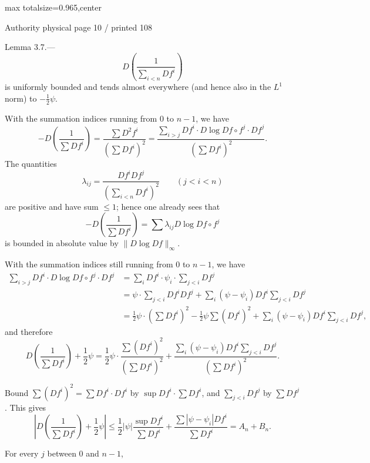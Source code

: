 \documentclass{article}
\begin{document}
\newpage
\noindent\begin{adjustbox}{max totalsize={\textwidth}{0.965\textheight},center}\begin{minipage}{\textwidth}
\noindent\hfill\scriptsize Authority physical page 10 / printed 108\par\normalsize
Lemma 3.7.—
\[
D\left(\frac1{\sum_{i<n}Df^i}\right)
\]
is uniformly bounded and tends almost everywhere (and hence also in the \(L^1\) norm) to \(-\frac12\psi\).

With the summation indices running from \(0\) to \(n-1\), we have
\[
-D\left(\frac1{\sum Df^i}\right)
=\frac{\sum D^2f^i}{(\sum Df^i)^2}
=\frac{\sum_{i>j}Df^i\cdot D\log Df\circ f^j\cdot Df^j}{(\sum Df^i)^2}.
\]
The quantities
\[
\lambda_{ij}=\frac{Df^iDf^j}{\left(\sum_{i<n}Df^i\right)^2}\qquad(j<i<n)
\]
are positive and have sum \(\leq1\); hence one already sees that
\[
-D\left(\frac1{\sum Df^i}\right)=\sum\lambda_{ij}D\log Df\circ f^j
\]
is bounded in absolute value by \(\|D\log Df\|_\infty\).

With the summation indices still running from \(0\) to \(n-1\), we have
\[
\begin{aligned}
\sum_{i>j}Df^i\cdot D\log Df\circ f^j\cdot Df^j
&=\sum_iDf^i\cdot\psi_i\cdot\sum_{j<i}Df^j\\
&=\psi\cdot\sum_{j<i}Df^iDf^j+\sum_i(\psi-\psi_i)Df^i\sum_{j<i}Df^j\\
&=\frac12\psi\cdot\left(\sum Df^i\right)^2-\frac12\psi\sum(Df^i)^2
+\sum_i(\psi-\psi_i)Df^i\sum_{j<i}Df^j,
\end{aligned}
\]
and therefore
\[
D\left(\frac1{\sum Df^i}\right)+\frac12\psi
=\frac12\psi\cdot\frac{\sum(Df^i)^2}{(\sum Df^i)^2}
+\frac{\sum_i(\psi-\psi_i)Df^i\sum_{j<i}Df^j}{(\sum Df^i)^2}.
\]

Bound \(\sum(Df^i)^2=\sum Df^i\cdot Df^i\) by \(\sup Df^i\cdot\sum Df^i\), and \(\sum_{j<i}Df^j\) by \(\sum Df^j\). This gives
\[
\left|D\left(\frac1{\sum Df^i}\right)+\frac12\psi\right|
\leq\frac12|\psi|\frac{\sup Df^i}{\sum Df^i}
+\frac{\sum|\psi-\psi_i|Df^i}{\sum Df^i}
=A_n+B_n.
\]

For every \(j\) between \(0\) and \(n-1\),
\end{minipage}\end{adjustbox}
\end{document}
